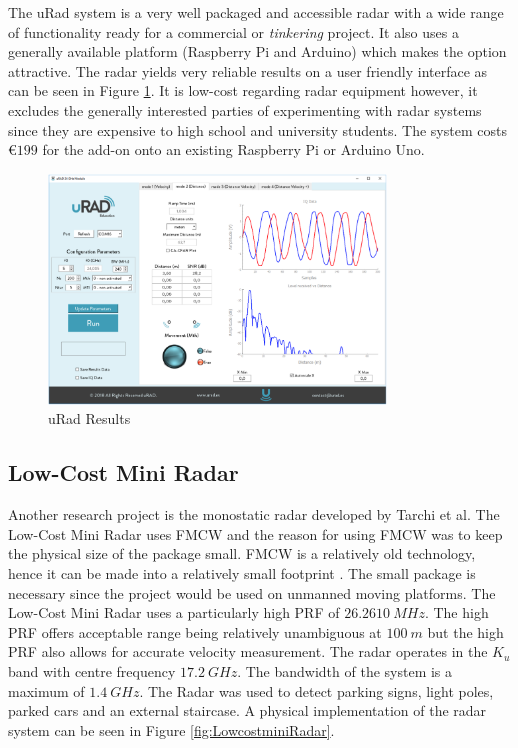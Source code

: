 The uRad system is a very well packaged and accessible radar with a wide range of functionality ready for a commercial or \textit{tinkering} project. It also uses a generally available platform (Raspberry Pi and Arduino) which makes the option attractive. The radar yields very reliable results on a user friendly interface as can be seen in Figure \ref{uRadRes}. It is low-cost regarding radar equipment however, it excludes the generally interested parties of experimenting with radar systems since they are expensive to high school and university students. The system costs \euro$199$ for the add-on onto an existing Raspberry Pi or Arduino Uno.
\begin{figure}[h!]
    \centering
    \includegraphics[width = 0.8\textwidth]{images/uRadRes.pdf}
    \caption{uRad Results \cite{noauthor_urad_2018-1}}\label{uRadRes}
\end{figure}

\subsection{Low-Cost Mini Radar}
Another research project is the monostatic radar developed by Tarchi et al. The Low-Cost Mini Radar uses FMCW and the reason for using FMCW was to keep the physical size of the package small. FMCW is a relatively old technology, hence it can be made into a relatively small footprint \cite{tarchi_low-cost_2017}. The small package is necessary since the project would be used on unmanned moving platforms. The Low-Cost Mini Radar uses a particularly high PRF of $26.2610\ MHz$. The high PRF offers acceptable range being relatively unambiguous at $100\ m$ but the high PRF also allows for accurate velocity measurement. The radar operates in the $K_u$ band with centre frequency $17.2\ GHz$. The bandwidth of the system is a maximum of $1.4\ GHz$. The Radar was used to detect parking signs, light poles, parked cars and an external staircase. A physical implementation of the radar system can be seen in Figure \ref{fig:LowcostminiRadar}.

